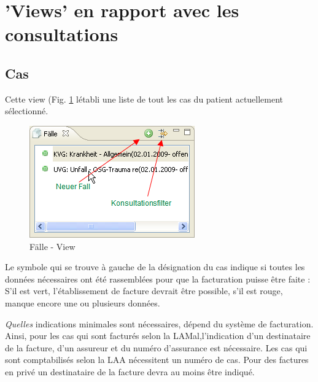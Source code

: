 

\section{'Views' en rapport avec les consultations}



\subsection{Cas}
Cette view (Fig. \ref{fig:faelle2} létabli une liste de tout les cas du patient actuellement sélectionné. 
\begin{figure}
  \includegraphics{images/faelleview}
  \caption{Fälle - View}
  \label{fig:faelle2}
\end{figure}

Le symbole qui se trouve à gauche de la désignation du cas indique si toutes les données nécessaires ont été rassemblées pour que la facturation puisse être faite : S'il est vert, l'établissement de facture devrait être possible, s'il est rouge, manque encore une ou plusieurs données.


\textit{Quelles} indications minimales sont nécessaires, dépend du système de facturation. Ainsi, pour les cas qui sont facturés selon la LAMal,l'indication d'un destinataire de la facture, d'un 	assureur et du numéro d'assurance est nécessaire. Les cas qui sont comptabilisés selon la LAA nécessitent un numéro de cas. Pour des factures en privé un destinataire de la facture devra au moins être indiqué.

